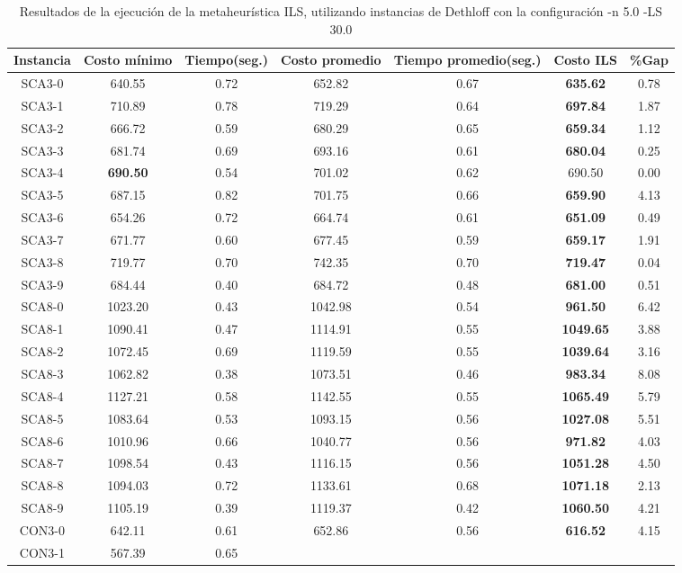 \begin{table}[ht]
\caption{Resultados de la ejecución de la metaheurística ILS, utilizando instancias de Dethloff con la configuración -n 5.0 -LS 30.0}
\centering
\small
\begin{tabular}{c c c c c c c}
\hline\hline
Instancia & Costo mínimo & Tiempo(seg.) & Costo promedio & Tiempo promedio(seg.) & Costo ILS & \%Gap \\ [0.5ex]
\hline
SCA3-0 & 640.55 & 0.72 & 
652.82 & 0.67 & \bf{635.62} & 
0.78\\SCA3-1 & 710.89 & 0.78 & 
719.29 & 0.64 & \bf{697.84} & 
1.87\\SCA3-2 & 666.72 & 0.59 & 
680.29 & 0.65 & \bf{659.34} & 
1.12\\SCA3-3 & 681.74 & 0.69 & 
693.16 & 0.61 & \bf{680.04} & 
0.25\\SCA3-4 & \bf{690.50} & 0.54 & 
701.02 & 0.62 & 690.50 & 0.00\\
SCA3-5 & 687.15 & 0.82 & 
701.75 & 0.66 & \bf{659.90} & 
4.13\\SCA3-6 & 654.26 & 0.72 & 
664.74 & 0.61 & \bf{651.09} & 
0.49\\SCA3-7 & 671.77 & 0.60 & 
677.45 & 0.59 & \bf{659.17} & 
1.91\\SCA3-8 & 719.77 & 0.70 & 
742.35 & 0.70 & \bf{719.47} & 
0.04\\SCA3-9 & 684.44 & 0.40 & 
684.72 & 0.48 & \bf{681.00} & 
0.51\\SCA8-0 & 1023.20 & 0.43 & 
1042.98 & 0.54 & \bf{961.50} & 
6.42\\SCA8-1 & 1090.41 & 0.47 & 
1114.91 & 0.55 & \bf{1049.65} & 
3.88\\SCA8-2 & 1072.45 & 0.69 & 
1119.59 & 0.55 & \bf{1039.64} & 
3.16\\SCA8-3 & 1062.82 & 0.38 & 
1073.51 & 0.46 & \bf{983.34} & 
8.08\\SCA8-4 & 1127.21 & 0.58 & 
1142.55 & 0.55 & \bf{1065.49} & 
5.79\\SCA8-5 & 1083.64 & 0.53 & 
1093.15 & 0.56 & \bf{1027.08} & 
5.51\\SCA8-6 & 1010.96 & 0.66 & 
1040.77 & 0.56 & \bf{971.82} & 
4.03\\SCA8-7 & 1098.54 & 0.43 & 
1116.15 & 0.56 & \bf{1051.28} & 
4.50\\SCA8-8 & 1094.03 & 0.72 & 
1133.61 & 0.68 & \bf{1071.18} & 
2.13\\SCA8-9 & 1105.19 & 0.39 & 
1119.37 & 0.42 & \bf{1060.50} & 
4.21\\CON3-0 & 642.11 & 0.61 & 
652.86 & 0.56 & \bf{616.52} & 
4.15\\CON3-1 & 567.39 & 0.65 & 

\end{tabular}
\end{table}
